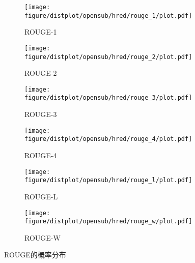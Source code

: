 \begin{figure}[H]
    \begin{subfigure}{0.4\linewidth}
        \centering
        \texttt{[image: figure/distplot/opensub/hred/rouge\_1/plot.pdf]}
        \caption{ROUGE-1}
    \end{subfigure}%
    \begin{subfigure}{0.4\linewidth}
        \centering
        \texttt{[image: figure/distplot/opensub/hred/rouge\_2/plot.pdf]}
        \caption{ROUGE-2}
    \end{subfigure}
    \begin{subfigure}{0.4\linewidth}
        \centering
        \texttt{[image: figure/distplot/opensub/hred/rouge\_3/plot.pdf]}
        \caption{ROUGE-3}
    \end{subfigure}%
    \begin{subfigure}{0.4\linewidth}
        \centering
        \texttt{[image: figure/distplot/opensub/hred/rouge\_4/plot.pdf]}
        \caption{ROUGE-4}
    \end{subfigure}
    \begin{subfigure}{0.4\linewidth}
        \centering
        \texttt{[image: figure/distplot/opensub/hred/rouge\_l/plot.pdf]}
        \caption{ROUGE-L}
    \end{subfigure}%
    \begin{subfigure}{0.4\linewidth}
        \centering
        \texttt{[image: figure/distplot/opensub/hred/rouge\_w/plot.pdf]}
        \caption{ROUGE-W}
    \end{subfigure}
    \centering
    \caption{ROUGE的概率分布}
    \label{fig:ROUGE_dist}
\end{figure}
